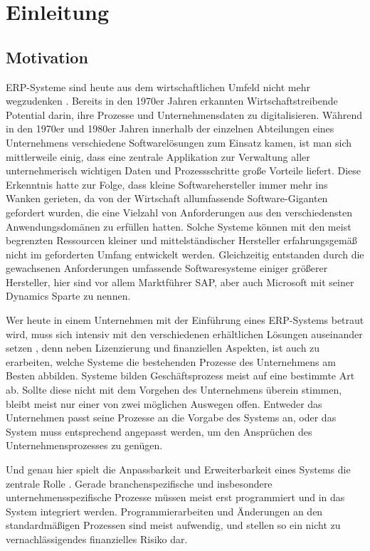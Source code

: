 \chapter{Einleitung}
\label{cha:Einleitung}

\section{Motivation}
\label{sec:Motivation}

ERP-Systeme sind heute aus dem wirtschaftlichen Umfeld nicht mehr wegzudenken \cite{WongTein2003}\cite{DuplagaMarzie2003}. Bereits in den 1970er Jahren erkannten Wirtschaftstreibende Potential darin, ihre Prozesse und Unternehmensdaten zu digitalisieren. Während in den 1970er und 1980er Jahren innerhalb der einzelnen Abteilungen eines Unternehmens verschiedene Softwarelösungen zum Einsatz kamen, ist man sich mittlerweile einig, dass eine zentrale Applikation zur Verwaltung aller unternehmerisch wichtigen Daten und Prozessschritte große Vorteile liefert. Diese Erkenntnis hatte zur Folge, dass kleine Softwarehersteller immer mehr ins Wanken gerieten, da von der Wirtschaft allumfassende Software-Giganten gefordert wurden, die eine Vielzahl von Anforderungen aus den verschiedensten Anwendungsdomänen zu erfüllen hatten. Solche Systeme können mit den meist begrenzten Ressourcen kleiner und mittelständischer Hersteller erfahrungsgemäß nicht im geforderten Umfang entwickelt werden. Gleichzeitig entstanden durch die gewachsenen Anforderungen umfassende Softwaresysteme einiger größerer Hersteller, hier sind vor allem Marktführer SAP, aber auch Microsoft mit seiner Dynamics Sparte zu nennen.

Wer heute in einem Unternehmen mit der Einführung eines ERP-Systems betraut wird, muss sich intensiv mit den verschiedenen erhältlichen Lösungen auseinander setzen \cite{WongTein2003}, denn neben Lizenzierung und finanziellen Aspekten, ist auch zu erarbeiten, welche Systeme die bestehenden Prozesse des Unternehmens am Besten abbilden. Systeme bilden Geschäftsprozess meist auf eine bestimmte Art ab. Sollte diese nicht mit dem Vorgehen des Unternehmens überein stimmen, bleibt meist nur einer von zwei möglichen Auswegen offen. Entweder das Unternehmen passt seine Prozesse an die Vorgabe des Systems an, oder das System muss entsprechend angepasst werden, um den Ansprüchen des Unternehmensprozesses zu genügen.

Und genau hier spielt die Anpassbarkeit und Erweiterbarkeit eines Systems die zentrale Rolle \cite{Sternad2013SuccessFF}. Gerade branchenspezifische und insbesondere unternehmensspezifische Prozesse müssen meist erst programmiert und in das System integriert werden. Programmierarbeiten und Änderungen an den standardmäßigen Prozessen sind meist aufwendig, und stellen so ein nicht zu vernachlässigendes finanzielles Risiko dar.

